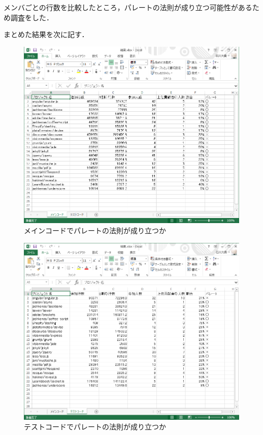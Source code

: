 \clearpage

メンバごとの行数を比較したところ，パレートの法則が成り立つ可能性があるため調査をした．

まとめた結果を次に記す．

\begin{figure}[h]
\centering
\includegraphics[width=13cm]{matome1.png}
\caption{メインコードでパレートの法則が成り立つか}
\end{figure}

\newpage

\begin{figure}[h]
\centering
\includegraphics[width=13cm]{matome2.png}
\caption{テストコードでパレートの法則が成り立つか}
\end{figure}

